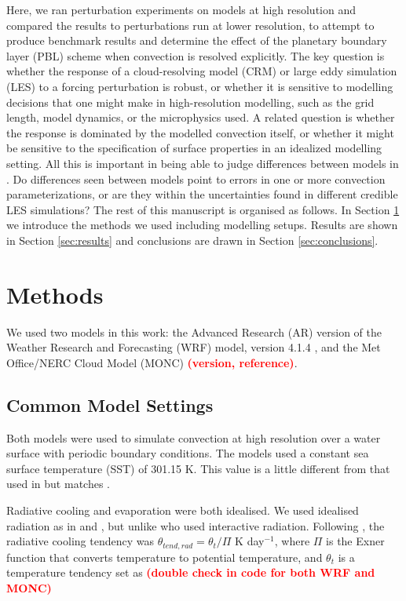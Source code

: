 \documentclass[draft]{agujournal2019}
\newcommand{\todo}[1]{\textcolor{red}{\textbf{(#1)}}}
\begin{document}
Here, we ran perturbation experiments on models at high resolution and compared
the results to perturbations run at lower resolution, to attempt to produce
benchmark results and determine the effect of the planetary boundary layer (PBL)
scheme when convection is resolved explicitly. The key question is whether the
response of a cloud-resolving model (CRM) or large eddy simulation (LES) to a
forcing perturbation is robust, or whether it is sensitive to modelling
decisions that one might make in high-resolution modelling, such as the grid
length, model dynamics, or the microphysics used. A related question is whether
the response is dominated by the modelled convection itself, or whether it might
be sensitive to the specification of surface properties in an idealized
modelling setting. All this is important in being able to judge differences
between models in . Do differences seen between models
point to errors in one or more convection parameterizations, or are they within
the uncertainties found in different credible LES simulations? The rest of this
manuscript is organised as follows. In Section \ref{sec:methods} we introduce
the methods we used including modelling setups. Results are shown in Section
\ref{sec:results} and conclusions are drawn in Section \ref{sec:conclusions}.

\section{Methods}
\label{sec:methods}

We used two models in this work: the Advanced Research (AR) version of the
Weather Research and Forecasting (WRF) model, version 4.1.4
\cite{Skamarock_2019}, and the Met Office/NERC Cloud Model (MONC) \todo{version,
reference}. 

\subsection{Common Model Settings}

Both models were used to simulate convection at high resolution over a water
surface with periodic boundary conditions. The models used a constant sea
surface temperature (SST) of 301.15 K. This value is a little different from
that used in  but matches .

Radiative cooling and evaporation were both idealised. We used idealised
radiation as in  and , but
unlike  who used interactive radiation. Following
, the radiative cooling tendency was $\theta_{tend,rad}
= \theta_t/\Pi$ K day$^{-1}$, where $\Pi$ is the Exner function that converts
temperature to potential temperature, and $\theta_t$ is a temperature tendency
set as \todo{double check in code for both WRF and MONC}
\end{document}
